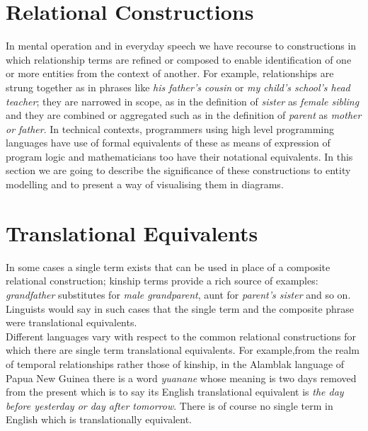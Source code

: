 

\section{Relational Constructions}
\noindent In mental operation and in everyday speech we have recourse to constructions in which relationship terms are refined or composed to enable identification of one or more entities from the context of another. For example, relationships are strung together as in phrases like \textit{his father's cousin} or \textit{my child's school's head teacher}; they are narrowed in scope, as in the definition of \textit{sister} as \textit{female sibling} and they are combined or aggregated such as in the definition of \textit{parent} as \textit{mother or father}. In technical contexts, programmers using high level programming languages have use of formal equivalents of these as means of expression of program logic and mathematicians too have their notational equivalents. In this section we are going to describe the significance of these constructions to entity modelling and to present a way of visualising them in diagrams. \\


\section{Translational Equivalents}
\noindent In some cases a single term exists that can be used in place of a composite relational construction; kinship terms provide a rich source of examples: \textit{grandfather} substitutes for \textit{male grandparent}, aunt for \textit{parent's sister} and so on. Linguists would say in such cases that the single term and the composite phrase were translational equivalents.\\

\noindent Different languages vary with respect to the common relational constructions for which there are single term translational equivalents. For example,from the realm of temporal relationships rather those of kinship, in the Alamblak language of Papua New Guinea there is a word \textit{yuanane} whose meaning is two days removed from the present which is to say its English translational equivalent is \textit{the day before yesterday or day after tomorrow}. There is of course no single term in English which is translationally equivalent.\\

